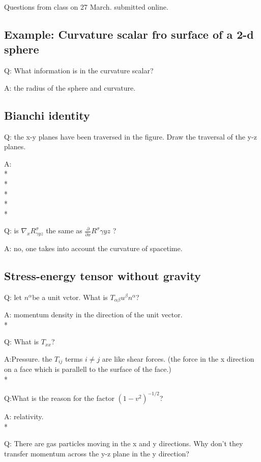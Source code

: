 \documentclass{article}
\begin{document}
\hspace{0.5cm}Questions from class on 27 March. submitted online.

\subsection{Example: Curvature scalar fro surface of a 2-d sphere}
\hspace{0.5cm}Q: What information is in the curvature scalar?

A: the radius of the sphere and curvature.
\subsection{Bianchi identity}
\hspace{0.5cm}Q: the x-y planes have been traversed in the figure. Draw the traversal of the y-z planes. 

A:
\\*
\\*
\\*
\\*
\\*

Q: is $\nabla_{x}R^{\sigma}_{\gamma y z}$ the same as $\frac{\partial}{\partial x}R^{\sigma}{\gamma y z}$ ?

A: no, one takes into account the curvature of spacetime. 
\subsection{Stress-energy tensor without gravity}
\hspace{0.5cm}Q: let $n^{\alpha}$be a unit vctor. What is $T_{\alpha\beta}u^{\beta}n^{\alpha}$?

A: momentum density in the direction of the unit vector. 
\\*

Q: What is $T_{xx}$?

A:Pressure. the $T_{ij}$ terms $i\neq j$ are like shear forces. (the force in the x direction on a face which is parallell to the surface of the face.)
\\*

Q:What is the reason for the factor $(1-v^{2})^{-1/2}$?

A: relativity.
\\*

Q: There are gas particles moving in the x and y directions. Why don't they transfer momentum across the y-z plane in the y direction?
\end{document}
